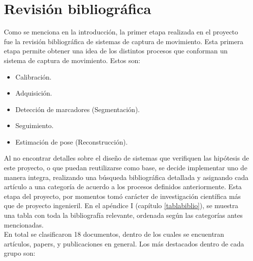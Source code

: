 \section{Revisión bibliográfica}
\label{invBiblio}

Como se menciona en la introducción, la primer etapa realizada en el proyecto fue la revisión bibliográfica de sistemas de captura de movimiento. Esta primera etapa permite obtener una idea de los distintos procesos que conforman un sistema de captura de movimiento. Estos son:

\begin{itemize}
	\item Calibración.
	\item Adquisición.
	\item Detección de marcadores (Segmentación).
	\item Seguimiento.
	\item Estimación de pose (Reconstrucción).
\end{itemize}

Al no encontrar detalles sobre el diseño de sistemas que verifiquen las hipótesis de este proyecto, o que puedan reutilizarse como base, se decide implementar uno de manera integra, realizando una búsqueda bibliográfica detallada y asignando cada artículo a una categoría de acuerdo a los procesos definidos anteriormente. Esta etapa del proyecto, por momentos tomó carácter de investigación científica más que de proyecto ingenieril. 
En el apéndice I (capítulo \ref{tablabiblio}), se muestra una tabla con toda la bibliografía relevante, ordenada según las categorías antes mencionadas.
\\ 

En total se clasificaron 18 documentos, dentro de los cuales se encuentran artículos, papers, y publicaciones en general. Los más destacados dentro de cada grupo son:

